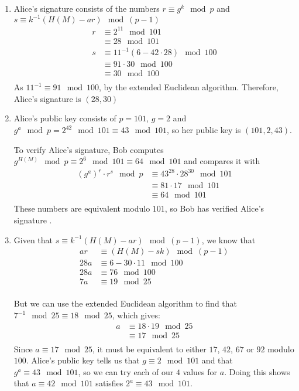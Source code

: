 \begin{enumerate}
\item Alice's signature consists of the numbers $r \equiv g^k\mod p$ and
  $s \equiv k^{-1}(H(M) - ar)\mod (p-1)$
  \begin{align*}
    r &\equiv 2^{11} \mod 101 \\
      &\equiv 28 \mod 101 \\
    s &\equiv 11^{-1}(6 - 42 \cdot 28)\mod 100 \\
      &\equiv 91 \cdot 30\mod 100 \\
      &\equiv 30 \mod 100\\
  \end{align*}
  As $11^{-1} \equiv 91\mod 100$, by the extended Euclidean algorithm. Therefore,
  Alice's signature is $(28, 30)$

\item Alice's public key consists of $p = 101$, $g = 2$ and $g^a \mod p = 2^{42}
\mod 101 \equiv 43 \mod 101$, so her public key is $(101, 2, 43)$.

  To verify Alice's signature, Bob computes $g^{H(M)} \mod p \equiv 2^6 \mod 101
  \equiv 64 \mod 101$ and compares it with
  \begin{align*}
    (g^a)^r \cdot r^s \mod p &\equiv 43^{28} \cdot 28^{30} \mod 101 \\
                             &\equiv 81 \cdot 17 \mod 101 \\
                             &\equiv 64 \mod 101\\
  \end{align*}
  These numbers are equivalent modulo $101$, so Bob has verified Alice's signature
  .

\item Given that $s \equiv k^{-1}(H(M) - ar)\mod (p-1)$, we know that
  \begin{align*}
    ar &\equiv (H(M) - sk) \mod (p-1) \\
    28a &\equiv 6 - 30 \cdot 11 \mod 100 \\
    28a &\equiv 76 \mod 100 \\
    7a &\equiv 19 \mod 25 \\
  \end{align*}

  But we can use the extended Euclidean algorithm to find that $7^{-1} \mod 25
  \equiv 18 \mod 25$, which gives:
  \begin{align*}
    a &\equiv 18 \cdot 19 \mod 25 \\
      &\equiv 17 \mod 25 \\
  \end{align*}
  Since $a \equiv 17 \mod 25$, it must be equivalent to either $17$, $42$, $67$ or
  $92$ modulo $100$. Alice's public key tells us that $g \equiv 2 \mod 101$ and
  that $g^a \equiv 43 \mod 101$, so we can try each of our $4$ values for $a$.
  Doing this shows that $a \equiv 42 \mod 101$ satisfies $2^a \equiv 43 \mod 101$.

\end{enumerate}
